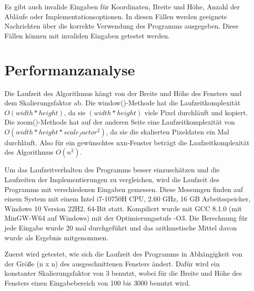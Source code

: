 \documentclass[course=erap]{aspdoc}
\begin{document}
    Es gibt auch invalide Eingaben für Koordinaten, Breite und Höhe, Anzahl der Abläufe oder Implementationsoptionen.
    In diesen Fällen werden geeignete Nachrichten über die korrekte Verwendung des Programms ausgegeben. Diese Fällen
    können mit invaliden Eingaben getestet werden.

    \section{Performanzanalyse}

    Die Laufzeit des Algorithmus hängt von der Breite und Höhe des Fensters und dem Skalierungsfaktor ab.
    Die window()-Methode hat die Laufzeitkomplexität $O(width * height)$, da sie $(width * height)$ viele Pixel
    durchläuft und kopiert. Die zoom()-Methode hat auf der anderen Seite eine Laufzeitkomplexität
    von $O(width * height * scale_factor^2)$, da sie die skalierten Pixeldaten ein Mal durchläuft. Also für ein
    gewünschtes nxn-Fenster beträgt die Laufzeitkomplexität des Algorithmus $O(n^2)$.

    Um das Laufzeitverhalten des Programms besser einzuschätzen und die Laufzeiten der Implementierungen zu vergleichen,
    wird die Laufzeit des Programms mit verschiedenen Eingaben gemessen. Diese Messungen finden auf einem System mit einem
    Intel i7-10750H CPU, 2.60 GHz, 16 GB Arbeitsspeicher, Windows 10 Version 22H2, 64-Bit statt. Kompiliert wurde mit
    GCC 8.1.0 (mit MinGW-W64 auf Windows) mit der Optimierungsstufe -O3. Die Berechnung für jede Eingabe wurde 20 mal
    durchgeführt und das arithmetische Mittel davon wurde als Ergebnis mitgenommen.

    Zuerst wird getestet, wie sich die Laufzeit des Programms in Abhängigkeit von der Größe (n x n) des ausgeschnittenen
    Fensters ändert. Dafür wird ein konstanter Skalierungsfaktor von 3 benutzt, wobei für die Breite und Höhe des Fensters
    einen Eingabebereich von 100 bis 3000 benutzt wird.
\end{document}

